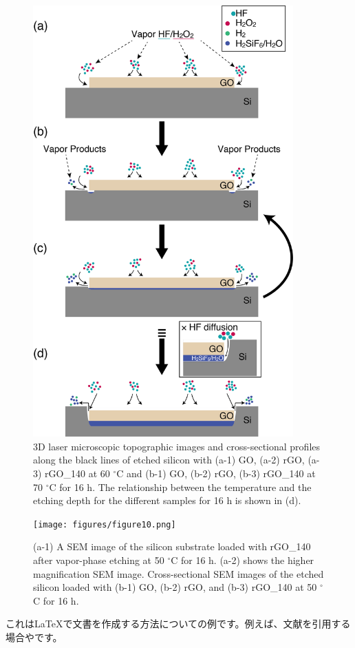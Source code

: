 \documentclass[platex,dvipdfmx]{jlreq}			%
\begin{document}
\begin{figure}[H]
    \centering
    \includegraphics[width=100mm]{figures/figure9.png}
    \caption{3D laser microscopic topographic images and cross-sectional profiles along the black lines of etched silicon with (a-1) GO, (a-2) rGO, (a-3) rGO\_140 at 60 ${}^\circ$C and (b-1) GO, (b-2) rGO, (b-3) rGO\_140 at 70 ${}^\circ$C for 16 h. The relationship between the temperature and the etching depth for the different samples for 16 h is shown in (d).}
    \label{fig:Schematic_mechanism}
\end{figure}

\begin{figure}[H]
    \centering
    \texttt{[image: figures/figure10.png]}
    \caption{(a-1) A SEM image of the silicon substrate loaded with rGO\_140 after vapor-phase etching at 50 ${}^\circ$C for 16 h. (a-2) shows the higher magnification SEM image. Cross-sectional SEM images of the etched silicon loaded with (b-1) GO, (b-2) rGO, and (b-3) rGO\_140 at 50 ${}^\circ$C for 16 h.}
    \label{fig:SEM}
\end{figure}



これは\LaTeX{}で文書を作成する方法についての例です。例えば、文献を引用する場合\supercite{tanaka2020}や\cite{suzuki2018}です。
\printbibliography
\end{document}
